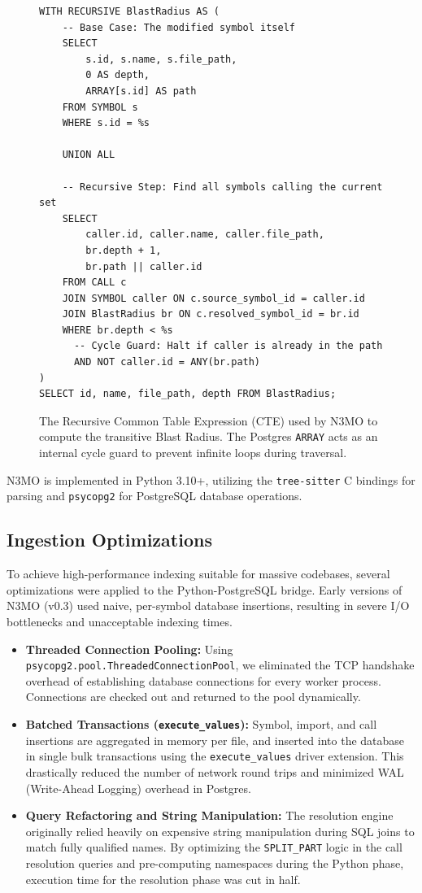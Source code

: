 \documentclass[conference]{IEEEtran}
\begin{document}
\begin{figure}[t!]
\begin{lstlisting}
WITH RECURSIVE BlastRadius AS (
    -- Base Case: The modified symbol itself
    SELECT 
        s.id, s.name, s.file_path, 
        0 AS depth, 
        ARRAY[s.id] AS path
    FROM SYMBOL s
    WHERE s.id = %s

    UNION ALL

    -- Recursive Step: Find all symbols calling the current set
    SELECT 
        caller.id, caller.name, caller.file_path, 
        br.depth + 1, 
        br.path || caller.id
    FROM CALL c
    JOIN SYMBOL caller ON c.source_symbol_id = caller.id
    JOIN BlastRadius br ON c.resolved_symbol_id = br.id
    WHERE br.depth < %s
      -- Cycle Guard: Halt if caller is already in the path
      AND NOT caller.id = ANY(br.path)
)
SELECT id, name, file_path, depth FROM BlastRadius;
\end{lstlisting}
\caption{The Recursive Common Table Expression (CTE) used by N3MO to compute the transitive Blast Radius. The Postgres \texttt{ARRAY} acts as an internal cycle guard to prevent infinite loops during traversal.}
\label{fig:sql_cte}
\end{figure}

N3MO is implemented in Python 3.10+, utilizing the \texttt{tree-sitter} C bindings for parsing and \texttt{psycopg2} for PostgreSQL database operations.

\subsection{Ingestion Optimizations}
To achieve high-performance indexing suitable for massive codebases, several optimizations were applied to the Python-PostgreSQL bridge. Early versions of N3MO (v0.3) used naive, per-symbol database insertions, resulting in severe I/O bottlenecks and unacceptable indexing times.

\begin{itemize}
    \item \textbf{Threaded Connection Pooling:} Using \texttt{psycopg2.pool.ThreadedConnectionPool}, we eliminated the TCP handshake overhead of establishing database connections for every worker process. Connections are checked out and returned to the pool dynamically.
    \item \textbf{Batched Transactions (\texttt{execute\_values}):} Symbol, import, and call insertions are aggregated in memory per file, and inserted into the database in single bulk transactions using the \texttt{execute\_values} driver extension. This drastically reduced the number of network round trips and minimized WAL (Write-Ahead Logging) overhead in Postgres.
    \item \textbf{Query Refactoring and String Manipulation:} The resolution engine originally relied heavily on expensive string manipulation during SQL joins to match fully qualified names. By optimizing the \texttt{SPLIT\_PART} logic in the call resolution queries and pre-computing namespaces during the Python phase, execution time for the resolution phase was cut in half.
\end{itemize}
\end{document}
